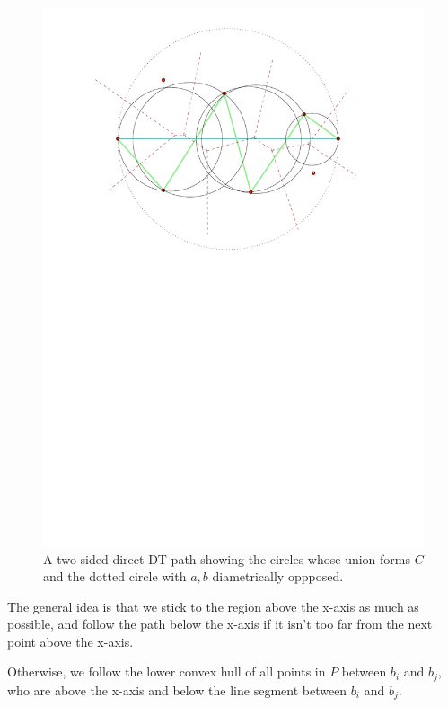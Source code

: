 \documentclass{tufte-handout}
\begin{document}
\begin{figure}
  \includegraphics[scale=1.0]{figures/two_sided_path_center_circles.pdf}
  \caption{A two-sided direct DT path showing the circles whose union
    forms $C$ and the dotted circle with $a,b$ diametrically
    oppposed.}
\end{figure}

The general idea is that we stick to the region above the x-axis as
much as possible, and follow the path below the x-axis if it isn't too
far from the next point above the x-axis.

Otherwise, we follow the lower convex hull of all points in $P$
between $b_i$ and $b_j$, who are above the x-axis and below the line
segment between $b_i$ and $b_j$.
\end{document}
